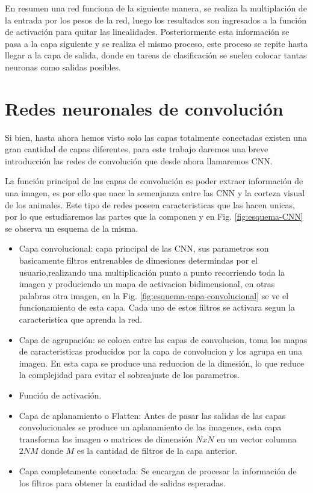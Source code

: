 En resumen una red funciona de la siguiente manera, se realiza la multiplación de la entrada por los pesos de la red, luego los resultados son ingresados a la función de activación para quitar las linealidades. Posteriormente esta información se pasa a la capa siguiente y se realiza el mismo proceso, este proceso se repite hasta llegar a la capa de salida, donde en tareas de clasificación se suelen colocar tantas neuronas como salidas posibles.

\section{Redes neuronales de convolución}

Si bien, hasta ahora hemos visto solo las capas totalmente conectadas existen una gran cantidad de capas diferentes, para este trabajo daremos una breve introducción las redes de convolución que desde ahora llamaremos CNN.

La función principal de las capas de convolución es poder extraer información de una imagen, es por ello que nace la semenjanza entre las CNN y la corteza visual de los animales.
Este tipo de redes poseen caracteristicas que las hacen unicas, por lo que
estudiaremos las partes que la componen y en Fig. \ref{fig:esquema-CNN} se observa un esquema de la misma.
\begin{itemize}
    \item Capa convolucional: capa principal de las CNN, sus parametros son basicamente filtros entrenables de dimesiones determindas por el
          usuario,realizando una multiplicación punto a punto recorriendo toda la imagen y produciendo un mapa de activacion bidimensional, en otras palabras otra imagen, en la
          Fig. \ref{fig:esquema-capa-convolucional} se ve el funcionamiento de esta capa. Cada uno de estos filtros se activara segun la caracteristica que aprenda la red.
    \item Capa de agrupación: se coloca entre las capas de convolucion, toma los mapas de caracteristicas producidos por la capa de
          convolucion y los agrupa en una imagen. En esta capa se produce una reduccion de la dimesión, lo que reduce la complejidad para evitar el sobreajuste de los parametros.
    \item Función de activación.
    \item Capa de aplanamiento o Flatten: Antes de pasar las salidas de las capas convolucionales se produce un aplanamiento de las imagenes, esta capa transforma las imagen o matrices de dimensión $NxN$ en un vector columna $2NM$ donde $M$ es la cantidad de filtros de la capa anterior.
    \item Capa completamente conectada: Se encargan de procesar la información de los filtros para obtener la cantidad de salidas esperadas.
\end{itemize}

